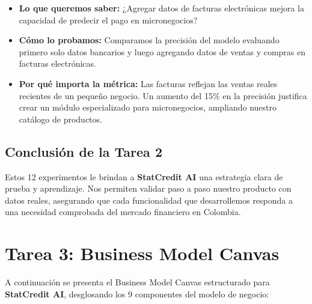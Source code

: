 \documentclass[11pt,a4paper]{article}
\begin{document}
\begin{tcolorbox}[colback=lightgray,colframe=secondary,title=\textbf{Experimento 6.2: Inclusión de datos de facturación electrónica (DIAN)}]
\begin{itemize}[leftmargin=*]
    \item \textbf{Lo que queremos saber:} ¿Agregar datos de facturas electrónicas mejora la capacidad de predecir el pago en micronegocios?
    \item \textbf{Cómo lo probamos:} Comparamos la precisión del modelo evaluando primero solo datos bancarios y luego agregando datos de ventas y compras en facturas electrónicas.
    \item \textbf{Por qué importa la métrica:} Las facturas reflejan las ventas reales recientes de un pequeño negocio. Un aumento del 15\% en la precisión justifica crear un módulo especializado para micronegocios, ampliando nuestro catálogo de productos.
\end{itemize}
\end{tcolorbox}

\subsection{Conclusión de la Tarea 2}
Estos 12 experimentos le brindan a \textbf{StatCredit AI} una estrategia clara de prueba y aprendizaje. Nos permiten validar paso a paso nuestro producto con datos reales, asegurando que cada funcionalidad que desarrollemos responda a una necesidad comprobada del mercado financiero en Colombia.

\newpage
\section{Tarea 3: Business Model Canvas}

A continuación se presenta el Business Model Canvas estructurado para \textbf{StatCredit AI}, desglosando los 9 componentes del modelo de negocio:
\end{document}
